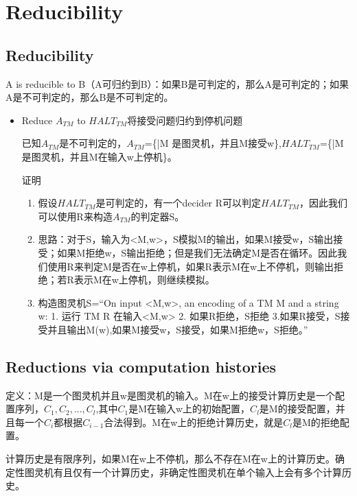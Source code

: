 \documentclass[UTF8]{ctexart}
\begin{document}
\section{Reducibility}

\subsection{Reducibility}

A is reducible to B（A可归约到B）：如果B是可判定的，那么A是可判定的；如果A是不可判定的，那么B是不可判定的。

\begin{itemize}
    \item Reduce $A_{TM}$ to $HALT_{TM}$将接受问题归约到停机问题
    
    已知$A_{TM}$是不可判定的，$A_{TM}$=\{<M,w>|M 是图灵机，并且M接受w\},$HALT_{TM}$=\{<M,w>|M 是图灵机，并且M在输入w上停机\}。

    证明
    \begin{enumerate}
        \item 假设$HALT_{TM}$是可判定的，有一个decider R可以判定$HALT_{TM}$，因此我们可以使用R来构造$A_{TM}$的判定器S。
        \item 思路：对于S，输入为<M,w>，S模拟M的输出，如果M接受w，S输出接受；如果M拒绝w，S输出拒绝；但是我们无法确定M是否在循环。因此我们使用R来判定M是否在w上停机，如果R表示M在w上不停机，则输出拒绝；若R表示M在w上停机，则继续模拟。
        \item 构造图灵机S=“On input <M,w>, an encoding of a TM M and a string w: 1. 运行 TM R 在输入<M,w> 2. 如果R拒绝，S拒绝 3.如果R接受，S接受并且输出M(w),如果M接受w，S接受，如果M拒绝w，S拒绝。”
    \end{enumerate}
\end{itemize}

\subsection{Reductions via computation histories}

定义：M是一个图灵机并且w是图灵机的输入。M在w上的接受计算历史是一个配置序列，$C_1,C_2,...,C_l$,其中$C_1$是M在输入w上的初始配置，$C_l$是M的接受配置，并且每一个$C_i$都根据$C_{i-1}$合法得到。M在w上的拒绝计算历史，就是$C_l$是M的拒绝配置。

计算历史是有限序列，如果M在w上不停机，那么不存在M在w上的计算历史。确定性图灵机有且仅有一个计算历史，非确定性图灵机在单个输入上会有多个计算历史。
\end{document}
